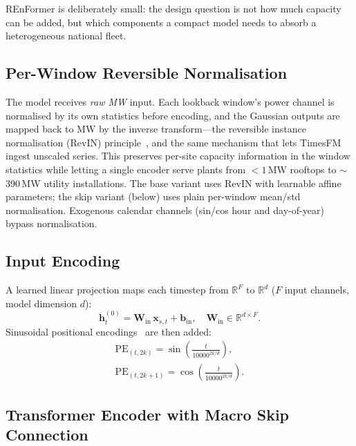 \documentclass[10pt,twocolumn]{article}
\begin{document}
REnFormer is deliberately small: the design question is not how much
capacity can be added, but which components a compact model needs to
absorb a heterogeneous national fleet.

\subsection{Per-Window Reversible Normalisation}

The model receives \emph{raw MW} input. Each lookback window's power
channel is normalised by its own statistics before encoding, and the
Gaussian outputs are mapped back to MW by the inverse transform---the
reversible instance normalisation (RevIN) principle~\cite{kim2022revin},
and the same mechanism that lets TimesFM ingest unscaled
series. This preserves per-site capacity information in the window
statistics while letting a single encoder serve plants from $<1$\,MW
rooftops to $\sim$390\,MW utility installations. The base variant uses
RevIN with learnable affine parameters; the skip variant (below) uses
plain per-window mean/std normalisation. Exogenous calendar channels
(sin/cos hour and day-of-year) bypass normalisation.

\subsection{Input Encoding}

A learned linear projection maps each timestep from $\mathbb{R}^F$ to
$\mathbb{R}^{d}$ ($F$ input channels, model dimension $d$):
\begin{equation}
  \mathbf{h}_t^{(0)} = \mathbf{W}_{\text{in}}\, \mathbf{x}_{s,t} + \mathbf{b}_{\text{in}},
  \quad \mathbf{W}_{\text{in}} \in \mathbb{R}^{d \times F}.
\end{equation}
Sinusoidal positional encodings~\cite{vaswani2017attention} are then added:
\begin{align}
  \text{PE}_{(t,2k)} = \sin\!\left(\frac{t}{10000^{2k/d}}\right),\\
  \text{PE}_{(t,2k+1)} = \cos\!\left(\frac{t}{10000^{2k/d}}\right).
\end{align}

\subsection{Transformer Encoder with Macro Skip Connection}
\end{document}
